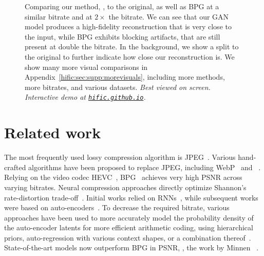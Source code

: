 \begin{figure}
\caption{\label{hific:fig:frontpic}Comparing our method, \ename, to the original, as well as BPG at a similar bitrate and at $2{\times}$ the bitrate. We can see that our GAN model produces a high-fidelity reconstruction that is very close to the input, while BPG exhibits blocking artifacts, that are still present at double the bitrate. In the background, we show a split to the original to further indicate how close our reconstruction is. 
    We show many more visual comparisons in Appendix~\ref{hific:sec:supp:morevisuals}, including more methods, more bitrates, and various datasets. 
    \newline\emph{Best viewed on screen. Interactive demo at \href{https://hific.github.io}{\texttt{hific.github.io}}.}}
\end{figure}

\section{Related work}

The most frequently used lossy compression algorithm is JPEG~\cite{jpeg1992wallace}. Various hand-crafted algorithms have been proposed to replace JPEG, including WebP~\cite{webpurl} and \jpegk~\cite{jpeg2000taubman}. 
Relying on the video codec HEVC~\cite{sullivan2012overview}, BPG~\cite{bpg} achieves very high PSNR across varying bitrates. 
Neural compression approaches directly optimize Shannon's rate-distortion trade-off~\cite{cover2012elements}. Initial works relied on RNNs~\cite{toderici2015variable,toderici2016full}, while subsequent works were based on auto-encoders~\cite{balle2016end,theis2017lossy,agustsson2017soft}. To decrease the required bitrate, various approaches have been used to more accurately model the probability density of the auto-encoder latents for more efficient arithmetic coding, using hierarchical priors, auto-regression with various context shapes, or a combination thereof~\cite{balle2018variational,mentzer2018conditional,li2017learning,rippel17a,minnen2018joint,lee2018context, minnen2020channel}. State-of-the-art models now outperform BPG in PSNR, \eg, the work by Minnen \etal~\cite{minnen2018joint}.

